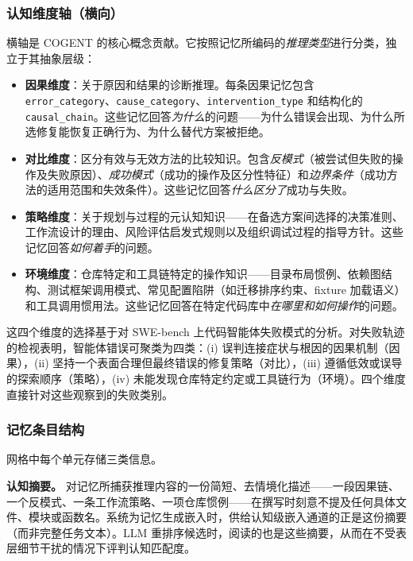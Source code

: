 \documentclass[UTF8,twocolumn]{ctexart}
\begin{document}
\subsubsection{认知维度轴（横向）}

横轴是 \textsc{COGENT} 的核心概念贡献。它按照记忆所编码的\emph{推理类型}进行分类，独立于其抽象层级：

\begin{itemize}
    \item \textbf{因果维度}：关于原因和结果的诊断推理。每条因果记忆包含 \texttt{error\_category}、\texttt{cause\_category}、\texttt{intervention\_type} 和结构化的 \texttt{causal\_chain}。这些记忆回答\emph{为什么}的问题——为什么错误会出现、为什么所选修复能恢复正确行为、为什么替代方案被拒绝。
    \item \textbf{对比维度}：区分有效与无效方法的比较知识。包含\emph{反模式}（被尝试但失败的操作及失败原因）、\emph{成功模式}（成功的操作及区分性特征）和\emph{边界条件}（成功方法的适用范围和失效条件）。这些记忆回答\emph{什么区分了}成功与失败。
    \item \textbf{策略维度}：关于规划与过程的元认知知识——在备选方案间选择的决策准则、工作流设计的理由、风险评估启发式规则以及组织调试过程的指导方针。这些记忆回答\emph{如何着手}的问题。
    \item \textbf{环境维度}：仓库特定和工具链特定的操作知识——目录布局惯例、依赖图结构、测试框架调用模式、常见配置陷阱（如迁移排序约束、fixture 加载语义）和工具调用惯用法。这些记忆回答在特定代码库中\emph{在哪里和如何操作}的问题。
\end{itemize}

这四个维度的选择基于对 SWE-bench 上代码智能体失败模式的分析。对失败轨迹的检视表明，智能体错误可聚类为四类：(i) 误判连接症状与根因的因果机制（因果），(ii) 坚持一个表面合理但最终错误的修复策略（对比），(iii) 遵循低效或误导的探索顺序（策略），(iv) 未能发现仓库特定约定或工具链行为（环境）。四个维度直接针对这些观察到的失败类别。

\subsubsection{记忆条目结构}

网格中每个单元存储三类信息。

\textbf{认知摘要。} 对记忆所捕获推理内容的一份简短、去情境化描述——一段因果链、一个反模式、一条工作流策略、一项仓库惯例——在撰写时刻意不提及任何具体文件、模块或函数名。系统为记忆生成嵌入时，供给认知级嵌入通道的正是这份摘要（而非完整任务文本）。LLM 重排序候选时，阅读的也是这些摘要，从而在不受表层细节干扰的情况下评判认知匹配度。
\end{document}
